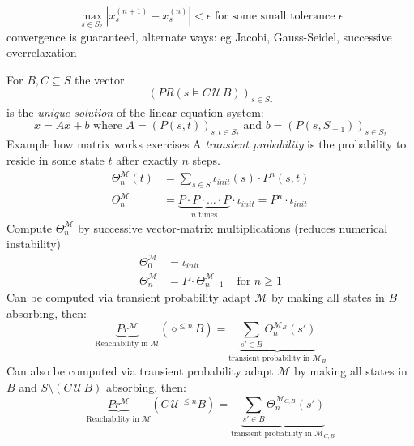 \documentclass[a4paper, 10pt]{article}
\newcommand{\until}{\,\mathcal{U}\,}
\newcommand{\underbraceset}[2]{\underset{#1}{\underbrace{#2}}}
\begin{document}
\begin{mdframed}
\begin{itemize}
\begin{itemize}
        \[
        \max_{s\in S_?} |x_s^(n+1)-x_s^{(n)}| < \epsilon \text{ for some small tolerance } \epsilon
        \]
        convergence is guaranteed, alternate ways: eg Jacobi, Gauss-Seidel, successive overrelaxation
    \end{itemize}
\end{itemize}
For $B,C\subseteq S$ the vector \[ \left(PR(s\models C\until B)\right)_{s\in S_?} \]
is the \emph{unique solution} of the linear equation system:
\[ x=Ax+b \text{ where } A=\left(P(s,t)\right)_{s,t\in S_?} \text{ and } b=(P(s,S_{=1}))_{s\in S_?} \]
Example how matrix works \follows exercises
A \emph{transient probability} is the probability to reside in some state $t$ after exactly $n$ steps.
\begin{align*}
\Theta^\mathcal{M}_n(t) &= \sum_{s\in S} \iota_{init}(s)\cdot P^n(s,t) \\
\Theta^\mathcal{M}_n &= \underbraceset{n \text{ times}}{P\cdot P\cdot\dots\cdot P}\cdot\iota_{init} = P^n\cdot\iota_{init}
\end{align*}
\follows Compute $\Theta_n^\mathcal{M}$ by successive vector-matrix multiplications (reduces numerical instability)
\begin{align*}
\Theta^\mathcal{M}_0 &= \iota_{init} \\
\Theta_n^\mathcal{M} &= P\cdot\Theta^\mathcal{M}_{n-1} & \text{ for } n\geq 1
\end{align*}
Can be computed via transient probability \follows adapt $\mathcal{M}$ by making all states in $B$ absorbing, then:
\[
\underbraceset{\text{Reachability in } \mathcal{M}}{Pr^\mathcal{M}}\left(\diamond^{\leq n}B\right) = \underbraceset{\text{transient probability in }\mathcal{M}_B}{\sum_{s'\in B}\Theta_n^{\mathcal{M}_B}(s')}
\]
Can also be computed via transient probability \follows adapt $\mathcal{M}$ by making all states in $B$ and $S\setminus(C\until B)$ absorbing, then:
\[
\underbraceset{\text{Reachability in } \mathcal{M}}{Pr^\mathcal{M}}\left(C\until^{\leq n}B\right) = \underbraceset{\text{transient probability in }\mathcal{M}_{C,B}}{\sum_{s'\in B}\Theta_n^{\mathcal{M}_{C,B}}(s')}
\]
\end{mdframed}
\end{document}
